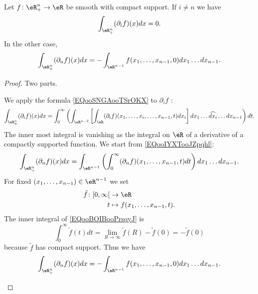 \begin{lemma}	\label{LEMooZKWKooBwNywC}
	Let \(f \colon \eR^n_+\to \eR  \) be smooth with compact support. If \( i\neq n\) we have
	\begin{equation}		\label{EQooZHSPooDFLaxv}
		\int_{\eR^n_+}(\partial_if)(x)dx=0.
	\end{equation}
	In the other case,
	\begin{equation}		\label{EQooZOYBooLyeoSl}
		\int_{\eR^n_+}(\partial_nf)(x)dx=-\int_{\eR^{n-1}}f(x_1,\ldots,x_{n-1},0)dx_1\ldots dx_{n-1}.
	\end{equation}
\end{lemma}

\begin{proof}
	Two parts.
	\begin{subproof}
		We apply the formula \eqref{EQooSNGAooTSrOKX} to \( \partial_if\) :
		\begin{equation}
			\int_{\eR^n_+}(\partial_if)(x)dx=\int_0^{\infty}\left(  \int_{\eR^{n-2}}\left[   \int_{\eR}(\partial_if)(x_1,\ldots,x_i,\ldots,x_{n-1},t)dx_i  \right]dx_1\ldots\widehat{dx_i}\ldots dx_{n-1} \right)dt.
		\end{equation}
		The inner most integral is vanishing as the integral on \( \eR\) of a derivative of a compactly supported function.
		We start from \eqref{EQooIYXTooJZpqhl}:
		\begin{equation}		\label{EQooBOIBooPrsqyJ}
			\int_{\eR^n_+}(\partial_nf)(x)dx=\int_{\eR^{n-1}}\left(  \int_0^{\infty}(\partial_nf)(x_1,\ldots,x_{n-1},t)dt \right)dx_1\ldots dx_{n-1}.
		\end{equation}
		For fixed \( (x_1,\ldots,x_{n-1})\in \eR^{n-1}\) we set
		\begin{equation}
			\begin{aligned}
				\tilde f\colon \mathopen[ 0,\infty\mathclose[ & \to \eR                           \\
				t                                             & \mapsto f(x_1,\ldots,x_{n-1}, t).
			\end{aligned}
		\end{equation}
		The inner integral of \eqref{EQooBOIBooPrsqyJ} is
		\begin{equation}
			\int_0^{\infty}\tilde f(t)dt=\lim_{R\to \infty}\tilde f(R)-\tilde f(0)=-\tilde f(0)
		\end{equation}
		because \( \tilde f\) has compact support. Thus we have
		\begin{equation}
			\int_{\eR^n_+}(\partial_nf)(x)dx=-\int_{\eR^{n-1}}f(x_1,\ldots,x_{n-1},0)dx_1\ldots dx_{n-1}.
		\end{equation}

	\end{subproof}
\end{proof}

